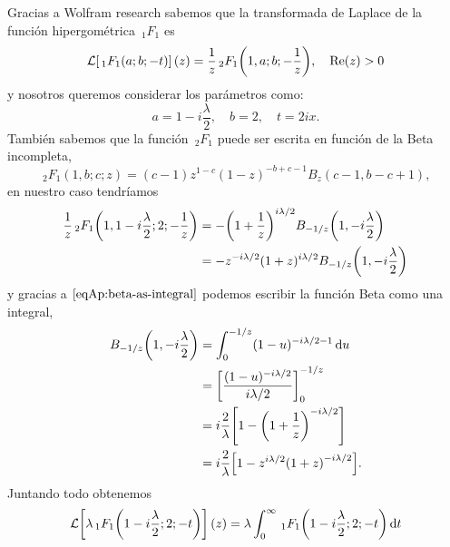 \documentclass[%
 aip,
 jmp,%
 amsmath,amssymb,
 reprint,%
]{revtex4-2}
\begin{document}
{%
Gracias a Wolfram research sabemos que la transformada de Laplace de la funci\'on hipergométrica $\,_1F_1$ es
\begin{equation}
    \mathcal{L}\qty[\,_1F_1(a;b;-t)](z)=\frac{1}{z}\,_2F_1\qty(1,a;b;-\frac{1}{z}),\quad \text{Re}(z)>0
\end{equation}
y nosotros queremos considerar los parámetros como:
\begin{equation}
    a=1-i\frac{\lambda}{2},\quad b=2,\quad t=2ix.
\end{equation}
También sabemos que la función $\,_2F_1$ puede ser escrita en función de la Beta incompleta,
\begin{equation}
    \,_2F_1(1,b;c;z)=(c-1)z^{1-c}(1-z)^{-b+c-1}B_z(c-1,b-c+1),
\end{equation}
en nuestro caso tendríamos
\begin{equation}
\begin{aligned}
    \frac{1}{z}\,_2F_1\qty(1,1-i\frac{\lambda}{2};2;-\frac{1}{z})&=-\qty(1+\frac{1}{z})^{i\lambda/2}B_{-1/z}\qty(1,-i\frac{\lambda}{2})\\
    &=-z^{-i\lambda/2}(1+z)^{i\lambda/2}B_{-1/z}\qty(1,-i\frac{\lambda}{2})
\end{aligned}
\end{equation}
y gracias a $\eqref{eqAp:beta-as-integral}$ podemos escribir la función Beta como una integral,
\begin{equation}
\begin{aligned}
    B_{-1/z}\qty(1,-i\frac{\lambda}{2})&=\int_0^{-1/z}(1-u)^{-i\lambda/2-1}\dd{u}\\
    &=\qty[\frac{(1-u)^{-i\lambda/2}}{i\lambda/2}]_0^{-1/z}\\
    &=i\frac{2}{\lambda}\qty[1-\qty(1+\frac{1}{z})^{-i\lambda/2}]\\
    &=i\frac{2}{\lambda}\qty[1-z^{i\lambda/2}\qty(1+z)^{-i\lambda/2}].
\end{aligned}
\end{equation}
Juntando todo obtenemos
\begin{equation}
\begin{aligned}
    \mathcal{L}\qty[\lambda\,_1F_1\qty(1-i\frac{\lambda}{2};2;-t)](z)&=\lambda\int_0^\infty \,_1F_1\qty(1-i\frac{\lambda}{2};2;-t)\dd{t}\\

\end{aligned}
\end{equation}}
\end{document}

